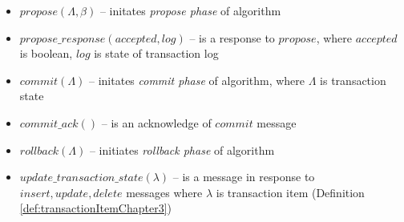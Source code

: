 \begin{definition}
\begin{itemize}
	\item $\mathit{propose}(\Lambda, \beta)$ -- initates \emph{propose phase} of \mpt algorithm
	\item $\mathit{propose\_response}(accepted, log)$ -- is a response to $\mathit{propose}$, where $\mathit{accepted}$ is boolean, $\mathit{log}$ is state of transaction log 
	\item $\mathit{commit}(\Lambda)$ -- initates \emph{commit phase} of \mpt algorithm, where $\Lambda$ is transaction state 
	\item $\mathit{commit\_ack()}$ -- is an acknowledge of $\mathit{commit}$ message 
	\item $\mathit{rollback}(\Lambda)$ -- initiates \emph{rollback phase} of \mpt algorithm
	\item $\mathit{update\_transaction\_state}(\lambda)$ -- is a message in response to $\mathit{insert, update, delete}$ messages where $\lambda$ is transaction item (Definition \ref{def:transactionItemChapter3}) 
	\end{itemize}
\end{definition}



